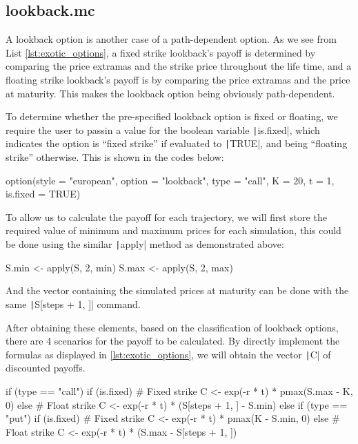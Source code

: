 \subsection{lookback.mc}

A lookback option is another case of a path-dependent option. As we see from List \ref{lst:exotic_options}, a fixed strike lookback's payoff is determined by comparing the price extramas and the strike price throughout the life time, and a floating strike lookback's payoff is by comparing the price extramas and the price at maturity. This makes the lookback option being obviously path-dependent.

To determine whether the pre-specified lookback option is fixed or floating, we require the user to passin a value for the boolean variable \texttt|is.fixed|, which indicates the option is ``fixed strike'' if evaluated to \texttt|TRUE|, and being ``floating strike'' otherwise. This is shown in the codes below:

\begin{Rminted}
option(style = "european", option = "lookback", type = "call", K = 20, t = 1, is.fixed = TRUE)
\end{Rminted}

To allow us to calculate the payoff for each trajectory, we will first store the required value of minimum and maximum prices for each simulation, this could be done using the similar \texttt|apply| method as demonstrated above:

\begin{Rminted}
S.min <- apply(S, 2, min)
S.max <- apply(S, 2, max)
\end{Rminted}

And the vector containing the simulated prices at maturity can be done with the same \texttt|S[steps + 1, ]| command.

After obtaining these elements, based on the classification of lookback options, there are 4 scenarios for the payoff to be calculated. By directly implement the formulas as displayed in \ref{lst:exotic_options}, we will obtain the vector \texttt|C| of discounted payoffs.

\begin{Rminted}
if (type == "call") {
    if (is.fixed) { # Fixed strike
        C <- exp(-r * t) * pmax(S.max - K, 0)
    } else { # Float strike
        C <- exp(-r * t) * (S[steps + 1, ] - S.min)
    }
} else if (type == "put") {
    if (is.fixed) { # Fixed strike
        C <- exp(-r * t) * pmax(K - S.min, 0)
    } else { # Float strike
        C <- exp(-r * t) * (S.max - S[steps + 1, ])
    }
}
\end{Rminted}

\newpage